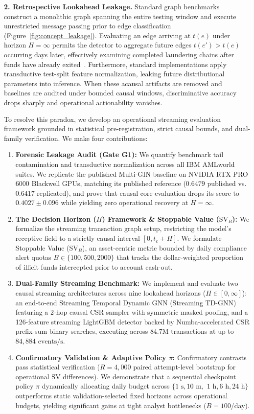 \documentclass[sigconf,nonacm]{acmart}
\begin{document}
\textbf{2. Retrospective Lookahead Leakage.} Standard graph benchmarks~\cite{egressy2024multigraph,blanusa2024gfp,lin2024fraudgt} construct a monolithic graph spanning the entire testing window and execute unrestricted message passing prior to edge classification (Figure~\ref{fig:concept_leakage}). Evaluating an edge arriving at $t(e)$ under horizon $H = \infty$ permits the detector to aggregate future edges $t(e') > t(e)$ occurring days later, effectively examining completed laundering chains after funds have already exited~\cite{kaufman2012leakage,nguyen2022future}. Furthermore, standard implementations apply transductive test-split feature normalization, leaking future distributional parameters into inference. When these acausal artifacts are removed and baselines are audited under bounded causal windows, discriminative accuracy drops sharply and operational actionability vanishes.

To resolve this paradox, we develop an operational streaming evaluation framework grounded in statistical pre-registration, strict causal bounds, and dual-family verification. We make four contributions:
\begin{enumerate}
    \item \textbf{Forensic Leakage Audit (Gate G1):} We quantify benchmark tail contamination and transductive normalization across all IBM AMLworld suites. We replicate the published Multi-GIN baseline on NVIDIA RTX PRO 6000 Blackwell GPUs, matching its published reference ($0.6479$ published vs.\ $0.6417$ replicated), and prove that causal core evaluation drops its score to $0.4027 \pm 0.096$ while yielding zero operational recovery at $H = \infty$.
    \item \textbf{The Decision Horizon ($H$) Framework \& Stoppable Value ($\text{SV}_B$):} We formalize the streaming transaction graph setup, restricting the model's receptive field to a strictly causal interval $[0, t_e + H]$. We formulate Stoppable Value ($\text{SV}_B$), an asset-centric metric bounded by daily compliance alert quotas $B \in \{100, 500, 2000\}$ that tracks the dollar-weighted proportion of illicit funds intercepted prior to account cash-out.
    \item \textbf{Dual-Family Streaming Benchmark:} We implement and evaluate two causal streaming architectures across nine lookahead horizons ($H \in [0, \infty]$): an end-to-end Streaming Temporal Dynamic GNN (Streaming TD-GNN) featuring a 2-hop causal CSR sampler with symmetric masked pooling, and a 126-feature streaming LightGBM detector backed by Numba-accelerated CSR prefix-sum binary searches, executing across $84.7\text{M}$ transactions at up to $84{,}884\text{ events/s}$.
    \item \textbf{Confirmatory Validation \& Adaptive Policy $\pi$:} Confirmatory contrasts pass statistical verification ($R=4{,}000$ paired attempt-level bootstrap for operational $\text{SV}$ differences). We demonstrate that a sequential checkpoint policy $\pi$ dynamically allocating daily budget across $\{1\text{ s}, 10\text{ m},$ $1\text{ h}, 6\text{ h}, 24\text{ h}\}$ outperforms static validation-selected fixed horizons across operational budgets, yielding significant gains at tight analyst bottlenecks ($B = 100$/day).
\end{enumerate}
\end{document}
